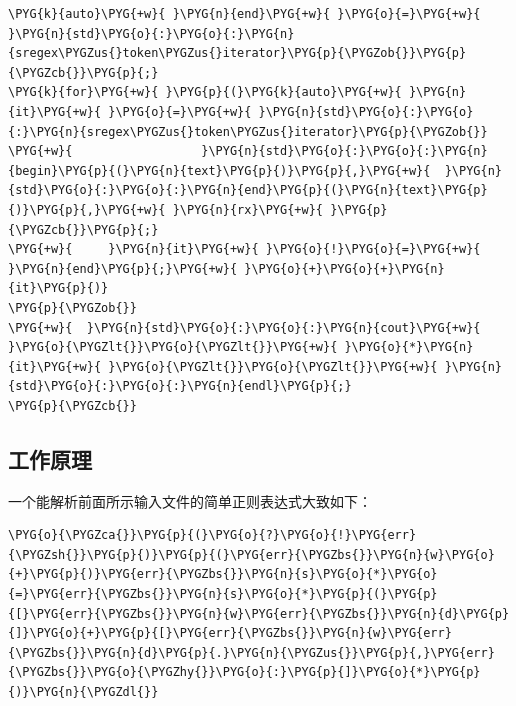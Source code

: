 
\begin{codeblockbg}
\begin{Verbatim}[commandchars=\\\{\},breaklines=true,breakanywhere=true,fontsize=\codefont,xleftmargin=17bp]
\PYG{k}{auto}\PYG{+w}{ }\PYG{n}{end}\PYG{+w}{ }\PYG{o}{=}\PYG{+w}{ }\PYG{n}{std}\PYG{o}{:}\PYG{o}{:}\PYG{n}{sregex\PYGZus{}token\PYGZus{}iterator}\PYG{p}{\PYGZob{}}\PYG{p}{\PYGZcb{}}\PYG{p}{;}
\PYG{k}{for}\PYG{+w}{ }\PYG{p}{(}\PYG{k}{auto}\PYG{+w}{ }\PYG{n}{it}\PYG{+w}{ }\PYG{o}{=}\PYG{+w}{ }\PYG{n}{std}\PYG{o}{:}\PYG{o}{:}\PYG{n}{sregex\PYGZus{}token\PYGZus{}iterator}\PYG{p}{\PYGZob{}}
\PYG{+w}{                  }\PYG{n}{std}\PYG{o}{:}\PYG{o}{:}\PYG{n}{begin}\PYG{p}{(}\PYG{n}{text}\PYG{p}{)}\PYG{p}{,}\PYG{+w}{  }\PYG{n}{std}\PYG{o}{:}\PYG{o}{:}\PYG{n}{end}\PYG{p}{(}\PYG{n}{text}\PYG{p}{)}\PYG{p}{,}\PYG{+w}{ }\PYG{n}{rx}\PYG{+w}{ }\PYG{p}{\PYGZcb{}}\PYG{p}{;}
\PYG{+w}{     }\PYG{n}{it}\PYG{+w}{ }\PYG{o}{!}\PYG{o}{=}\PYG{+w}{ }\PYG{n}{end}\PYG{p}{;}\PYG{+w}{ }\PYG{o}{+}\PYG{o}{+}\PYG{n}{it}\PYG{p}{)}
\PYG{p}{\PYGZob{}}
\PYG{+w}{  }\PYG{n}{std}\PYG{o}{:}\PYG{o}{:}\PYG{n}{cout}\PYG{+w}{ }\PYG{o}{\PYGZlt{}}\PYG{o}{\PYGZlt{}}\PYG{+w}{ }\PYG{o}{*}\PYG{n}{it}\PYG{+w}{ }\PYG{o}{\PYGZlt{}}\PYG{o}{\PYGZlt{}}\PYG{+w}{ }\PYG{n}{std}\PYG{o}{:}\PYG{o}{:}\PYG{n}{endl}\PYG{p}{;}
\PYG{p}{\PYGZcb{}}
\end{Verbatim}
\end{codeblockbg}



\subsection{工作原理}



一个能解析前面所示输入文件的简单正则表达式大致如下：



\begin{codeblockbg}
\begin{Verbatim}[commandchars=\\\{\},breaklines=true,breakanywhere=true,fontsize=\codefont,xleftmargin=17bp]
\PYG{o}{\PYGZca{}}\PYG{p}{(}\PYG{o}{?}\PYG{o}{!}\PYG{err}{\PYGZsh{}}\PYG{p}{)}\PYG{p}{(}\PYG{err}{\PYGZbs{}}\PYG{n}{w}\PYG{o}{+}\PYG{p}{)}\PYG{err}{\PYGZbs{}}\PYG{n}{s}\PYG{o}{*}\PYG{o}{=}\PYG{err}{\PYGZbs{}}\PYG{n}{s}\PYG{o}{*}\PYG{p}{(}\PYG{p}{[}\PYG{err}{\PYGZbs{}}\PYG{n}{w}\PYG{err}{\PYGZbs{}}\PYG{n}{d}\PYG{p}{]}\PYG{o}{+}\PYG{p}{[}\PYG{err}{\PYGZbs{}}\PYG{n}{w}\PYG{err}{\PYGZbs{}}\PYG{n}{d}\PYG{p}{.}\PYG{n}{\PYGZus{}}\PYG{p}{,}\PYG{err}{\PYGZbs{}}\PYG{o}{\PYGZhy{}}\PYG{o}{:}\PYG{p}{]}\PYG{o}{*}\PYG{p}{)}\PYG{n}{\PYGZdl{}}
\end{Verbatim}
\end{codeblockbg}


